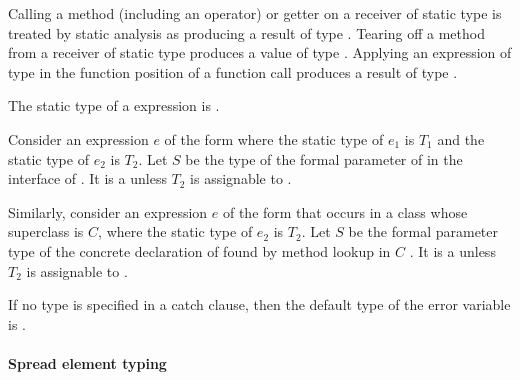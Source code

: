 \documentclass[makeidx]{article}
\begin{document}
{

Calling a method (including an operator) or getter on a receiver of static type
 is treated by static analysis as producing a result of type .
Tearing off a method from a receiver of static type  produces a value of
type .  Applying an expression of type  in the function position
of a function call produces a result of type .

The static type of a  expression is .

Consider an expression $e$ of the form  where the static type of
$e_1$ is $T_1$ and the static type of $e_2$ is $T_2$. Let $S$ be the type of the
formal parameter of  in the interface of .
It is a  unless $T_2$ is assignable to .

Similarly, consider an expression $e$ of the form  that occurs in a
class whose superclass is $C$, where the static type of $e_2$ is $T_2$. Let $S$ be
the formal parameter type of the concrete declaration of  found by
method lookup in $C$
.
It is a  unless $T_2$ is assignable to .


If no type is specified in a catch clause, then the default type of the error
variable is .

\paragraph{Spread element typing}

}
\end{document}
